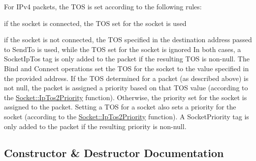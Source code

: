 For I\+Pv4 packets, the T\+OS is set according to the following rules\+:
\begin{DoxyItemize}
\item if the socket is connected, the T\+OS set for the socket is used
\item if the socket is not connected, the T\+OS specified in the destination address passed to Send\+To is used, while the T\+OS set for the socket is ignored In both cases, a Socket\+Ip\+Tos tag is only added to the packet if the resulting T\+OS is non-\/null. The Bind and Connect operations set the T\+OS for the socket to the value specified in the provided address. If the T\+OS determined for a packet (as described above) is not null, the packet is assigned a priority based on that T\+OS value (according to the \hyperlink{classns3_1_1Socket_a81564620cc94d291f1dc5d79b2f13b4a}{Socket\+::\+Ip\+Tos2\+Priority} function). Otherwise, the priority set for the socket is assigned to the packet. Setting a T\+OS for a socket also sets a priority for the socket (according to the \hyperlink{classns3_1_1Socket_a81564620cc94d291f1dc5d79b2f13b4a}{Socket\+::\+Ip\+Tos2\+Priority} function). A Socket\+Priority tag is only added to the packet if the resulting priority is non-\/null. 
\end{DoxyItemize}

\subsection{Constructor \& Destructor Documentation}
